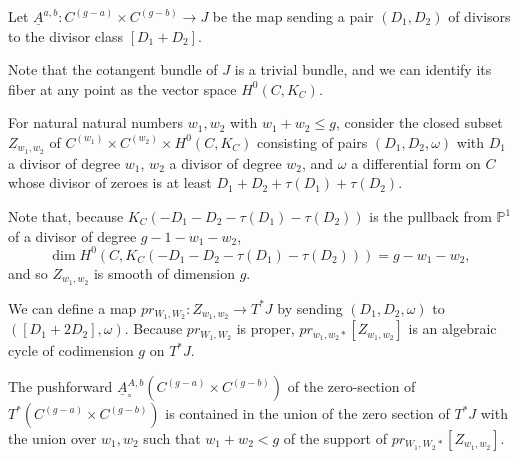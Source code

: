 Let $\underline{A}^{a,b}: C^{(g-a)} \times C^{(g-b)} \to J$ be the map sending a pair $(D_1,D_2)$ of divisors to the divisor class $[D_1+D_2]$.

Note that the cotangent bundle of $J$ is a trivial bundle, and we can identify its fiber at any point as the vector space $H^0(C, K_C)$.

 For natural natural numbers $w_1,w_2$ with $w_1+ w_2 \leq g$, consider the closed subset $Z_{w_1,w_2}$ of  $C^{ (w_1) } \times C^{ (w_2)} \times H^0(C, K_C) $ consisting of pairs $(D_1,D_2, \omega )$ with $D_1$ a divisor of degree $w_1$, $w_2$ a divisor of degree $w_2$, and $\omega$ a differential form on $C$ whose divisor of zeroes is at least $D_1+D_2+ \tau(D_1) + \tau(D_2)$.

 Note that, because $K_C (- D_1- D_2-  \tau(D_1) - \tau(D_2) )$ is the pullback from $\mathbb P^1$ of a divisor of degree $g-1 -w_1-w_2$, \[\dim H^0 (C, K_C (- D_1- D_2-  \tau(D_1) - \tau(D_2) ) ) = g-w_1-w_2,\] and so $Z_{w_1,w_2}$ is smooth of dimension $g$.

 We can define a map $pr_{W_1,W_2}: Z_{w_1,w_2} \to T^* J$ by sending $(D_1,D_2, \omega)$ to $( [D_1+ 2D_2], \omega)$. Because $pr_{W_1, W_2}$ is proper, $pr_{w_1,w_2 *} [ Z_{w_1,w_2} ] $ is an algebraic cycle of codimension $g$ on $T^* J$.

\begin{lemma}
\notready\label{ts-singular} The pushforward $ \underline{A}^{A,b}_{\circ} (C^{(g-a)} \times C^{(g-b)} ) $ of the zero-section of $T^* ( C^{(g-a)} \times C^{(g-b)} )$ is contained in the union of the zero section of $T^* J$ with the union over $w_1,w_2$ such that $w_1+w_2<g$ of the support of $pr_{W_1,W_2 *} [ Z_{w_1,w_2} ]$. \end{lemma}

